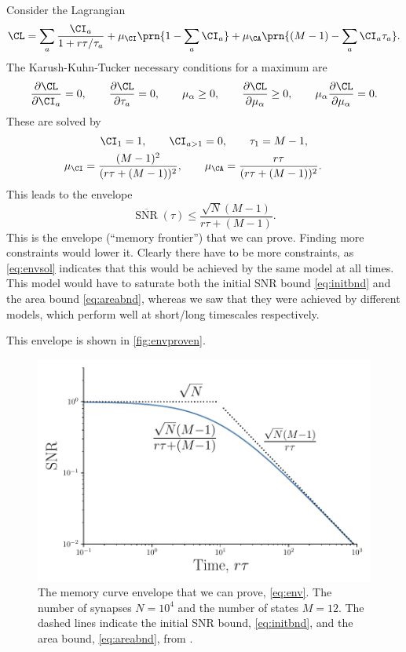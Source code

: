 \documentclass[12pt]{article}
\DeclareMathOperator{\snr}{SNR}
\newcommand{\snrb}{\overline{\snr}}
\renewcommand{\pdiff}[2]{\frac{\partial #1}{\partial #2}}
\begin{document}
Consider the Lagrangian
%
\begin{equation}\label{eq:envlagrangian}
  \CL = \sum_a \frac{\CI_a}{1+r\tau/\tau_a} + \mu_\CI \prn{1 - \sum_a \CI_a} + \mu_\CA \prn{(M-1) - \sum_a \CI_a \tau_a}.
\end{equation}
%
The Karush-Kuhn-Tucker necessary conditions for a maximum are
%
\begin{equation}\label{eq:envKTcond}
  \pdiff{\CL}{\CI_a} = 0, \qquad
  \pdiff{\CL}{\tau_a} = 0, \qquad
  \mu_\alpha \geq 0, \qquad
  \pdiff{\CL}{\mu_\alpha} \geq 0, \qquad
  \mu_\alpha\pdiff{\CL}{\mu_\alpha} = 0.
\end{equation}
%
These are solved by
%
\begin{equation}\label{eq:envsol}
\begin{gathered}
  \CI_1 = 1, \qquad
  \CI_{a>1} = 0, \qquad
  \tau_1 = M-1, \\
  \mu_\CI = \frac{(M-1)^2}{(r\tau + (M-1))^2}, \qquad
  \mu_\CA = \frac{r\tau}{(r\tau+(M-1))^2}. \qquad
\end{gathered}
\end{equation}
%
This leads to the envelope
%
\begin{equation}\label{eq:env}
  \snrb(\tau) \leq \frac{\sqrt{N}(M-1)}{r\tau + (M-1)}.
\end{equation}
%
This is the envelope (``memory frontier'') that we can prove.
Finding more constraints would lower it.
Clearly there have to be more constraints, as \eqref{eq:envsol} indicates that this would be achieved by the same model at all times.
This model would have to saturate both the initial SNR bound \eqref{eq:initbnd} and the area bound \eqref{eq:areabnd}, whereas we saw that they were achieved by different models, which perform well at short/long timescales respectively.

This envelope is shown in \autoref{fig:envproven}.


\begin{figure}[tb]
  \centering
  \includegraphics[width=0.8\linewidth]{LenvProven.pdf}
  \caption[Proven envelope for the signal-to-noise ratio]
  {The memory curve envelope that we can prove, \eqref{eq:env}.
  The number of synapses $N=10^4$ and the number of states $M=12$.
  The dashed lines indicate the initial SNR bound, \eqref{eq:initbnd}, and the area bound, \eqref{eq:areabnd}, from \cite{Lahiri2013synapse}.}\label{fig:envproven}
\end{figure}
\end{document}
